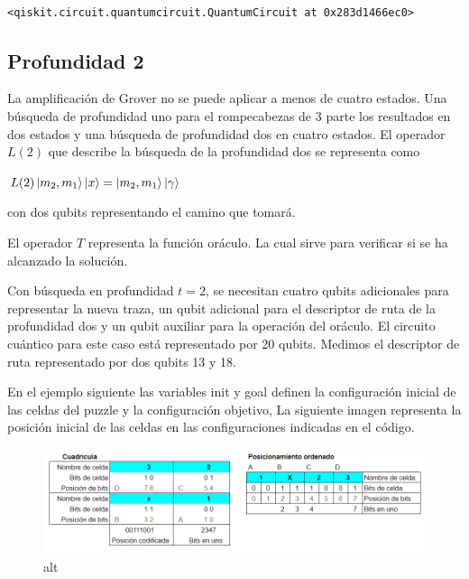 \documentclass[11pt]{article}
\makeatletter
\newcommand{\boxspacing}{\kern\kvtcb@left@rule\kern\kvtcb@boxsep}
\newcommand{\prompt}[4]{
        {\ttfamily\llap{{\color{#2}[#3]:\hspace{3pt}#4}}\vspace{-\baselineskip}}
    }
\makeatother
\begin{document}
    \begin{center}
    \end{center}
    { \hspace*{\fill} \\}
    
            \begin{tcolorbox}[breakable, size=fbox, boxrule=.5pt, pad at break*=1mm, opacityfill=0]
\prompt{Out}{outcolor}{3}{\boxspacing}
\begin{Verbatim}[commandchars=\\\{\}]
<qiskit.circuit.quantumcircuit.QuantumCircuit at 0x283d1466ec0>
\end{Verbatim}
\end{tcolorbox}
        
    \hypertarget{profundidad-2}{%
\subsection{Profundidad 2}\label{profundidad-2}}

La amplificación de Grover no se puede aplicar a menos de cuatro
estados. Una búsqueda de profundidad uno para el rompecabezas de 3 parte
los resultados en dos estados y una búsqueda de profundidad dos en
cuatro estados. El operador \(L(2)\) que describe la búsqueda de la
profundidad dos se representa como

\(L(2) \ket{m_2 , m_1}\ket{x} = \ket{m_2 , m_1}\ket{\gamma}\)

con dos qubits representando el camino que tomará.

El operador \(T\) representa la función oráculo. La cual sirve para
verificar si se ha alcanzado la solución.

Con búsqueda en profundidad \(t = 2\), se necesitan cuatro qubits
adicionales para representar la nueva traza, un qubit adicional para el
descriptor de ruta de la profundidad dos y un qubit auxiliar para la
operación del oráculo. El circuito cuántico para este caso está
representado por 20 qubits. Medimos el descriptor de ruta representado
por dos qubits 13 y 18.

En el ejemplo siguiente las variables init y goal definen la
configuración inicial de las celdas del puzzle y la configuración
objetivo, La siguiente imagen representa la posición inicial de las
celdas en las configuraciones indicadas en el código.

\begin{figure}
\centering
\includegraphics{Posicion-inicial.png}
\caption{alt}
\end{figure}
\end{document}
